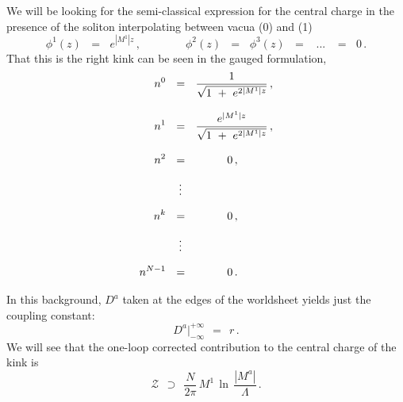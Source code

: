 \documentclass[epsfig,12pt]{article}
\def\beq{\begin{equation}}
\def\eeq{\end{equation}}
\def\beq{\begin{equation}}
\def\eeq{\end{equation}}
\newcommand{\ov}{\overline}
\newcommand{\mc}[1]{\mathcal{#1}}
\begin{document}
	We will be looking for the semi-classical expression for the central charge in the presence
	of the soliton interpolating between vacua ({\sc \small 0}) and ({\sc \small 1})
\beq
	\phi^1(z)  \,~~=~~\, e^{|M^1| z}\,, \qquad\qquad  \phi^2(z) \,~~=~~\, \phi^3(z) \,~~=~~ \,~...~\, ~~=~~\, 0\,.
\eeq
	That this is the right kink can be seen in the gauged formulation,
\begin{align}
%
\notag
	n^0  & ~~=~~ \frac {             1              }
 	                   {\sqrt{ 1 ~+~ e^{2 |M^1| z} }}\,, \\[3mm]
%
\notag
	n^1  & ~~=~~ \frac {         e^{|M^1| z}        }
 	                   {\sqrt{ 1 ~+~ e^{2 |M^1| z} }}\,, \\[3mm]
%
\notag
	n^2  & ~~=~~ \qquad~~\, 0\,,  \\[2mm]
%	 
	     & ~~~\,\vdots          \\[2mm]
%
\notag
	n^k  & ~~=~~ \qquad~~\, 0\,,  \\[2mm]
%	 
\notag
 	     & ~~~\,\vdots          \\[2mm]
%
\notag
	n^{N-1} & ~~=~~ \qquad~~\, 0\,.                
\end{align}

	In this background, $ D^a $ taken at the edges of the worldsheet yields just the coupling constant:
\beq
	D^a \Big|^{\scriptscriptstyle +\infty}_{\scriptscriptstyle -\infty} ~~=~~    r\,.
\eeq
	We will see that the one-loop corrected contribution to the central charge of the kink is
\beq
       \mc{Z} ~~\supset~~ \frac{N}{2\pi}\, M^1\, \ln\, \frac{   |M^a|   }
                                                            {  \Lambda  }\,.
\eeq
\end{document}

